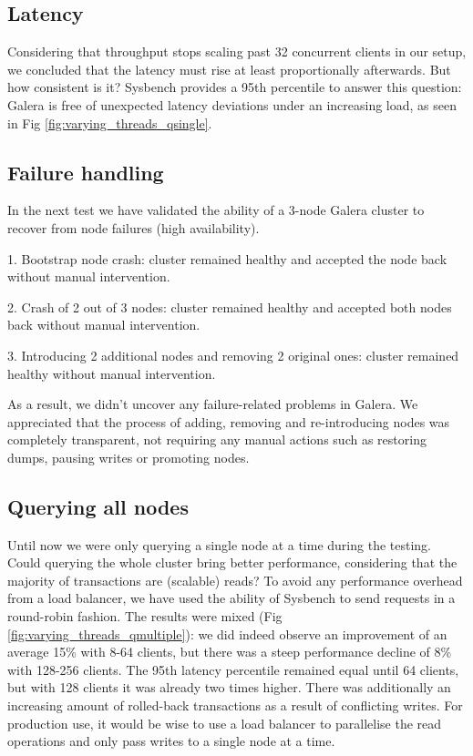 \documentclass{sig-alternate}
\begin{document}
\subsection{Latency}

Considering that throughput stops scaling past 32 concurrent clients in our setup, we concluded that the latency must rise at least proportionally afterwards. But how consistent is it? Sysbench provides a 95th percentile to answer this question: Galera is free of unexpected latency deviations under an increasing load, as seen in Fig \ref{fig:varying_threads_qsingle}.

\subsection{Failure handling}

In the next test we have validated the ability of a 3-node Galera cluster to recover from node failures (high availability).

1. Bootstrap node crash: cluster remained healthy and accepted the node back without manual intervention.

2. Crash of 2 out of 3 nodes: cluster remained healthy and accepted both nodes back without manual intervention.

3. Introducing 2 additional nodes and removing 2 original ones: cluster remained healthy without manual intervention.

As a result, we didn't uncover any failure-related problems in Galera. We appreciated that the process of adding, removing and re-introducing nodes was completely transparent, not requiring any manual actions such as restoring dumps, pausing writes or promoting nodes.

\subsection{Querying all nodes}

Until now we were only querying a single node at a time during the testing. Could querying the whole cluster bring better performance, considering that the majority of transactions are (scalable) reads? To avoid any performance overhead from a load balancer, we have used the ability of Sysbench to send requests in a round-robin fashion. The results were mixed (Fig \ref{fig:varying_threads_qmultiple}): we did indeed observe an improvement of an average 15\% with 8-64 clients, but there was a steep performance decline of 8\% with 128-256 clients. The 95th latency percentile remained equal until 64 clients, but with 128 clients it was already two times higher. There was additionally an increasing amount of rolled-back transactions as a result of conflicting writes. For production use, it would be wise to use a load balancer to parallelise the read operations and only pass writes to a single node at a time.
\end{document}
